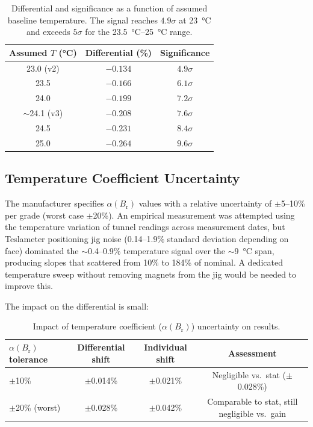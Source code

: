 \documentclass[11pt,letterpaper]{article}
\newcommand{\Br}{B_\mathrm{r}}
\newcommand{\alphar}{\alpha(\Br)}
\begin{document}
\begin{table}[H]
\centering
\caption{Differential and significance as a function of assumed baseline
temperature. The signal reaches $4.9\sigma$ at \SI{23}{\celsius} and exceeds
$5\sigma$ for the \SIrange{23.5}{25}{\celsius} range.}
\label{tab:temp_scan}
\begin{tabular}{@{}ccc@{}}
\toprule
\textbf{Assumed $T$ (\si{\celsius})} & \textbf{Differential (\%)} & \textbf{Significance} \\
\midrule
23.0 (v2) & $-0.134$ & $4.9\sigma$ \\
23.5      & $-0.166$ & $6.1\sigma$ \\
24.0      & $-0.199$ & $7.2\sigma$ \\
$\sim$24.1 (v3) & $-0.208$ & $7.6\sigma$ \\
24.5      & $-0.231$ & $8.4\sigma$ \\
25.0      & $-0.264$ & $9.6\sigma$ \\
\bottomrule
\end{tabular}
\end{table}

\subsection{Temperature Coefficient Uncertainty}

The manufacturer specifies $\alphar$ values with a relative uncertainty of
$\pm$5--10\% per grade (worst case $\pm$20\%). An empirical measurement was
attempted using the temperature variation of tunnel readings across
measurement dates, but Teslameter positioning jig noise
(0.14--1.9\% standard deviation depending on face) dominated the
$\sim$0.4--0.9\% temperature signal over the $\sim$\SI{9}{\celsius} span,
producing slopes that scattered from 10\% to 184\% of nominal. A dedicated
temperature sweep without removing magnets from the jig would be needed to
improve this.

The impact on the differential is small:

\begin{table}[H]
\centering
\caption{Impact of temperature coefficient ($\alphar$) uncertainty on results.}
\label{tab:alpha_uncertainty}
\begin{tabular}{@{}lccc@{}}
\toprule
$\alphar$ tolerance & Differential shift & Individual shift & Assessment \\
\midrule
$\pm$10\% & $\pm$0.014\% & $\pm$0.021\% & Negligible vs.\ stat ($\pm$0.028\%) \\
$\pm$20\% (worst) & $\pm$0.028\% & $\pm$0.042\% & Comparable to stat, still negligible vs.\ gain \\
\bottomrule
\end{tabular}
\end{table}
\end{document}
